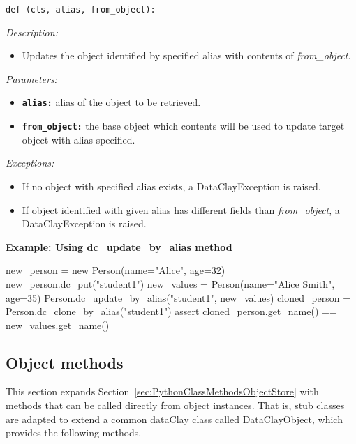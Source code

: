 
\begin{dBox}
\texttt{def  (cls, alias, from\_object):}
\LINE

{\it Description:}

\begin{itemize}
    \item Updates the object identified by specified alias with contents of \textit{from\_object}.
\end{itemize}

{\it Parameters:}
\begin{itemize}
    \item \texttt{\bfseries alias:} alias of the object to be retrieved.
    \item \texttt{\bfseries from\_object:} the base object which contents will be used to update target object with alias specified.
\end{itemize}

{\it Exceptions:}

\begin{itemize}
    \item If no object with specified alias exists, a DataClayException is raised.
    \item If object identified with given alias has different fields than \textit{from\_object}, a DataClayException is raised.
\end{itemize}

\end{dBox}

\begin{tBox}
\textcolor{basecolor} {\bf Example: Using dc\_update\_by\_alias method}
\begin{java}
new_person = new Person(name="Alice", age=32)
new_person.dc_put("student1")
new_values = Person(name="Alice Smith", age=35)
Person.dc_update_by_alias("student1", new_values)
cloned_person = Person.dc_clone_by_alias("student1")
assert cloned_person.get_name() == new_values.get_name()
\end{java}
\end{tBox}



\subsection{Object methods}
\label{sec:PythonObjectStoreStubMethods}

This section expands Section~\ref{sec:PythonClassMethodsObjectStore} with methods that can be called directly from object instances. That is, stub classes are adapted to extend a common dataClay class called DataClayObject, which provides the following methods.


